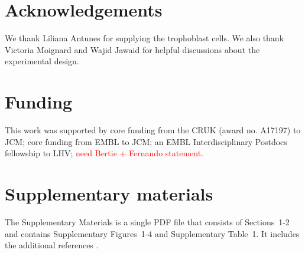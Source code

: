 \documentclass{article}
\newcommand{\suppfigbiophys}{4}
\newcommand{\suppsecsim}{2}
\begin{document}
\section{Acknowledgements}
We thank Liliana Antunes for supplying the trophoblast cells.
We also thank Victoria Moignard and Wajid Jawaid for helpful discussions about the experimental design.

\section{Funding}
This work was supported by core funding from the CRUK (award no. A17197) to JCM;
core funding from EMBL to JCM;
an EMBL Interdisciplinary Postdocs fellowship to LHV;
\textcolor{red}{need Bertie + Fernando statement.}

\section{Supplementary materials}
The Supplementary Materials is a single PDF file that consists of Sections~1-\suppsecsim{} and contains Supplementary Figures~1-\suppfigbiophys{} and Supplementary Table~1.
It includes the additional references \cite{law2014voom,ritchie2015limma}.

{\small


}
\end{document}
